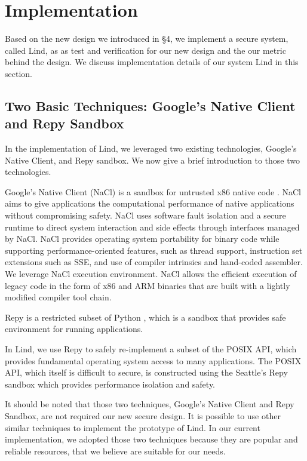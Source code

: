 \section{Implementation}
\label{sec.implementation}

Based on the new design we introduced in \S{4}, we implement a secure system, called Lind, as 
as test and verification for our new design and the our metric behind the design. We discuss 
implementation details of our system Lind in this section. 

\subsection{Two Basic Techniques: Google's Native Client and Repy Sandbox}
In the implementation of Lind, we leveraged two existing technologies, Google's Native Client, 
and Repy sandbox. We now give a brief introduction to those two technologies.

Google's Native Client (NaCl) is a sandbox for untrusted x86 native code \cite{NaCl:09}. 
NaCl aims to give applications the computational performance of native applications 
without compromising safety. NaCl uses software fault isolation 
and a secure runtime to direct system interaction and side effects through interfaces managed by NaCl. 
NaCl provides operating system portability for binary code 
while supporting performance-oriented features, 
such as thread support, instruction set extensions such as SSE, and use of compiler intrinsics and 
hand-coded assembler. We leverage NaCl execution environment. NaCl allows the efficient execution of legacy code 
in the form of x86 and ARM binaries that are built with a lightly modified compiler tool chain.

Repy is a restricted subset of Python \cite{Repy:10}, which is a sandbox that 
provides safe environment for running applications.

In Lind, we use Repy to safely re-implement a subset of the POSIX API, which provides 
fundamental operating system access to many applications. The POSIX API, which itself is difficult to secure, 
is constructed using the Seattle's Repy sandbox which provides performance isolation and safety. 

It should be noted that those two techniques, Google's Native Client and Repy Sandbox, are not required
our new secure design. It is possible to use other similar techniques to implement the prototype of Lind. 
In our current implementation, we adopted those two techniques because they are popular and reliable 
resources, that we believe are suitable for our needs. 

